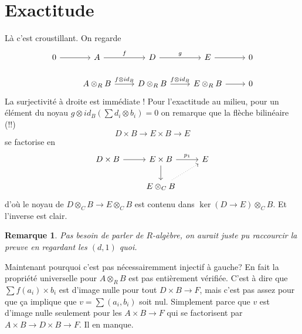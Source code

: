 \documentclass[a4paper,12pt]{book}
\theoremstyle{plain}
\newtheorem{rem}{Remarque}
\theoremstyle{definition}
\theoremstyle{remark}
\begin{document}
\section{Exactitude}
Là c'est croustillant.  On regarde
\[\begin{tikzcd}
	0 & A & D & E & 0 \\
	& {A\otimes_R B} & {D\otimes_R B} & {E\otimes_R B} & 0
	\arrow[from=1-1, to=1-2]
	\arrow["f", from=1-2, to=1-3]
	\arrow["g", from=1-3, to=1-4]
	\arrow[from=1-4, to=1-5]
	\arrow["{f\otimes id_B}", from=2-2, to=2-3]
	\arrow["{f\otimes id_B}", from=2-3, to=2-4]
	\arrow[from=2-4, to=2-5]
\end{tikzcd}\]
La surjectivité à droite est immédiate ! Pour l'exactitude au
milieu, pour un élément du noyau
$g\otimes id_B (\sum d_i\otimes b_i)=0$
on remarque que la flèche bilinéaire (!!)
\[D\times B\to E\times B\to E\]
se factorise en
\[\begin{tikzcd}
	{D\times B} & {E\times B} & E \\
	& {E\otimes_C B}
	\arrow[from=1-1, to=1-2]
	\arrow["{p_1}", from=1-2, to=1-3]
	\arrow[from=1-2, to=2-2]
	\arrow[dotted, from=2-2, to=1-3]
\end{tikzcd}\]
d'où le noyau de $D\otimes_C B\to E\otimes_C B$ est
contenu dans $\ker(D\to E)\otimes_C B$. Et l'inverse est clair.

\begin{rem}
    Pas besoin de parler de $R$-algèbre, on aurait juste pu
    raccourcir la preuve en regardant les $(d,1)$ quoi.
\end{rem}

Maintenant pourquoi c'est pas nécessairemment injectif à gauche? 
En fait la propriété universelle pour $A\otimes_R B$ est pas
entièrement vérifiée. C'est à dire que $\sum f(a_i)\times b_i$ est
d'image nulle pour tout $D\times B\to F$, mais c'est pas assez pour
que ça implique que $v=\sum (a_i,b_i)$ soit nul. Simplement parce
que $v$ est d'image nulle seulement pour les $A\times B\to F$ qui
se factorisent par $A\times B\to D\times B\to F$. Il en manque.
\end{document}
